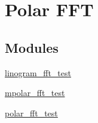 \hypertarget{group__applications__polarFFT}{
\section{Polar FFT}
\label{group__applications__polarFFT}
}
\subsection*{Modules}
\begin{CompactItemize}
\item 
\hyperlink{group__applications__polarFFT__linogramm}{linogram\_\-fft\_\-test}
\item 
\hyperlink{group__applications__polarFFT__mpolar}{mpolar\_\-fft\_\-test}
\item 
\hyperlink{group__applications__polarFFT__polar}{polar\_\-fft\_\-test}
\end{CompactItemize}
